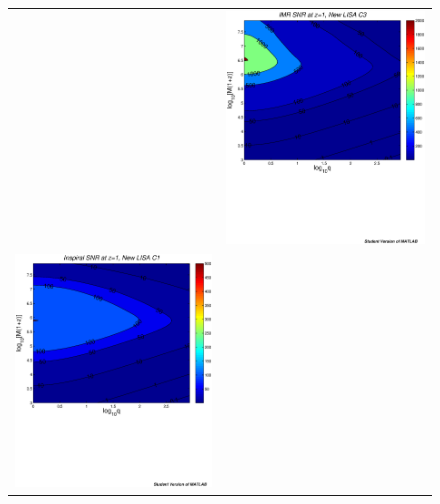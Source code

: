 \documentclass{iopart}
\begin{document}
\begin{figure}[H]
\begin{center}
\begin{tabular}{cc}
&\includegraphics[scale=0.41,clip=true]{FigEmanuele/C3IMRSNRContourz1.ps}\\
\includegraphics[scale=0.41,clip=true]{FigEmanuele/C1InspSNRContourz1.ps}

\end{tabular}
\end{center}
\end{figure}
\end{document}
